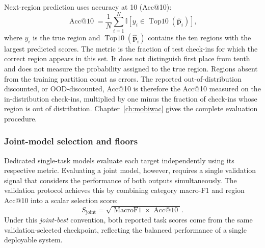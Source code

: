 Next-region prediction uses accuracy at 10 (Acc@10):
\begin{equation}\label{eq:fund:acc10}
    \operatorname{Acc@10} = \frac{1}{N}\sum_{i=1}^{N}
    \mathbb{I}\!\left[y_i \in \operatorname{Top10}(\hat{\mathbf{p}}_i)\right],
\end{equation}
where $y_i$ is the true region and $\operatorname{Top10}(\hat{\mathbf{p}}_i)$ contains
the ten regions with the largest predicted scores. The metric is the fraction of test
check-ins for which the correct region appears in this set. It does not distinguish
first place from tenth and does not measure the probability assigned to the true
region. Regions absent from the training partition count as errors. The reported
out-of-distribution discounted, or OOD-discounted, Acc@10 is therefore the Acc@10
measured on the in-distribution check-ins, multiplied by one minus the fraction of
check-ins whose region is out of distribution. Chapter~\ref{ch:mobiwac} gives the
complete evaluation procedure.

\subsubsection{Joint-model selection and floors}

Dedicated single-task models evaluate each target independently using its respective
metric. Evaluating a joint model, however, requires a single validation signal that
considers the performance of both outputs simultaneously. The validation protocol
achieves this by combining category macro-F1 and region Acc@10 into a scalar
selection score:
\begin{equation}\label{eq:fund:joint-selection}
    S_{\mathrm{joint}} = \sqrt{\operatorname{MacroF1} \times \operatorname{Acc@10}}.
\end{equation}
Under this \emph{joint-best} convention, both reported task scores come from the same
validation-selected checkpoint, reflecting the balanced performance of a single
deployable system.


